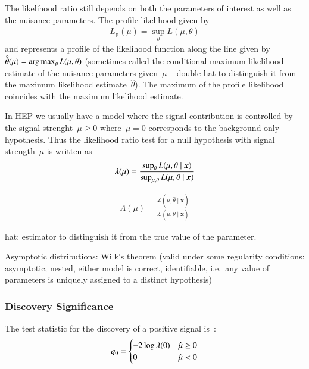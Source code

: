 The likelihood ratio still depends on both the parameters of interest
as well as the nuisance parameters. The profile likelihood given by
\begin{align*}
  L_\text{p}(\mu) = \sup_\theta L(\mu, \theta) %
\end{align*}
and represents a profile of the likelihood function along the line
given by~$\hat{\hat{\theta}}(\mu) = \operatorname*{arg\,max}_\theta L(\mu, \theta)$
(sometimes called the conditional maximum likelihood estimate of the
nuisance parameters given~$\mu$ -- double hat to distinguish it from
the maximum likelihood estimate~$\hat{\theta}$). The maximum of the
profile likelihood coincides with the maximum likelihood estimate.


In HEP we usually have a model where the signal contribution is
controlled by the signal strenght~$\mu \geq 0$ where~$\mu = 0$
corresponds to the background-only hypothesis. Thus the likelihood
ratio test for a null hypothesis with signal strength~$\mu$ is written as
\begin{align}
  \lambda(\mu) = \frac{\sup_\theta L(\mu, \theta \mid \boldx)}{\sup_{\mu,\theta} L(\mu, \theta \mid \boldx)}
\end{align}


\begin{align*}
  \Lambda(\mu) = \frac{\mathcal{L}\left( \mu, \hat{\hat{\theta}} \mid \mathbf{x} \right)}
                      {\mathcal{L}\left( \hat{\mu}, \hat{\theta} \mid \mathbf{x} \right)}
\end{align*}


hat: estimator to distinguish it from the true value of the parameter.

Asymptotic distributions: Wilk's theorem (valid under some regularity
conditions: asymptotic, nested, either model is correct, identifiable,
i.e.\ any value of parameters is uniquely assigned to a distinct
hypothesis)



\subsubsection{Discovery Significance}


The test statistic for the discovery of a positive signal
is~\cite{Cowan:2010js}:
\begin{align}
  q_0 =
  \begin{cases}
    -2 \log \lambda(0) & \hat{\mu} \geq 0 \\
    0 & \hat{\mu} < 0
  \end{cases}
\end{align}




